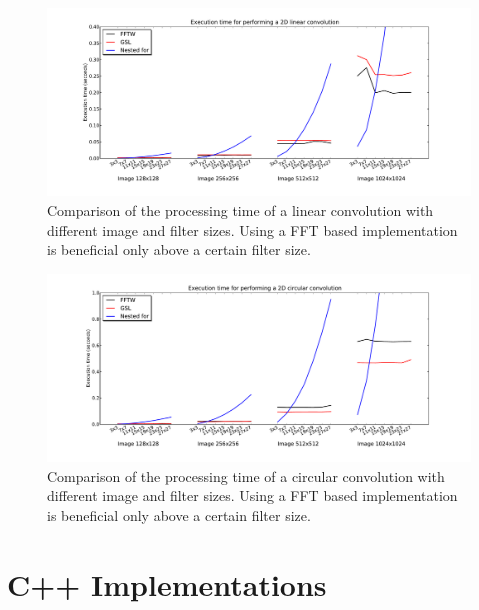 \documentclass[a4paper,10pt,twoside]{article}
\begin{document}
\begin{figure}[htbp]
\center \includegraphics[width=.75\linewidth]{Images/benchmark_linear_everything.pdf}
\caption{\label{fig:benchmark_linear_everything.pdf} Comparison of the processing time of a linear convolution with different image and filter sizes. Using a FFT based implementation is beneficial only above a certain filter size.}
\end{figure}

\begin{figure}[htbp]
\center \includegraphics[width=.75\linewidth]{Images/benchmark_circular_everything.pdf}
\caption{\label{fig:benchmark_circular_everything.pdf} Comparison of the processing time of a circular convolution with different image and filter sizes. Using a FFT based implementation is beneficial only above a certain filter size.}
\end{figure}

\section{C++ Implementations}
\end{document}
